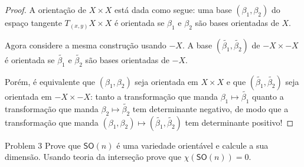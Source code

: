 \begin{proof}\leavevmode
A orientação de \(X \times X\) está dada como segue: uma base \((\beta_1,\beta_2)\) do espaço tangente \(T_(x,y) X \times X\) é orientada se \(\beta_1\) e \(\beta_2\) são bases orientadas de \(X\).

Agora considere a mesma construção usando \(-X\). A base \((\tilde{\beta_1},\tilde{\beta_2})\) de \(-X \times -X\) é orientada se \(\tilde{\beta_1}\) e \(\tilde{\beta_2}\) são bases orientadas de \(-X\).

Porém, é equivalente que \((\beta_1,\beta_2)\) seja orientada em \(X\times X\) e que \((\tilde{\beta_1},\tilde{\beta_2})\) seja orientada em \(-X \times -X\): tanto a transformação que manda \(\beta_1 \mapsto \tilde{\beta_1}\) quanto a transformação que manda \(\beta_2 \mapsto \tilde{\beta_2}\) tem determinante negativo, de modo que a transformação que manda \((\beta_1,\beta_2)\mapsto (\tilde{\beta_1},\tilde{\beta_2})\) tem determinante positivo!
\end{proof}

\begin{thing1}{Problem 3}\label{prob:3}\leavevmode
Prove que \(\mathsf{SO}(n)\) é uma variedade orientável e calcule a sua dimensão. Usando teoria da interseção prove que \(\chi(\mathsf{SO}(n))=0\).
\end{thing1}

